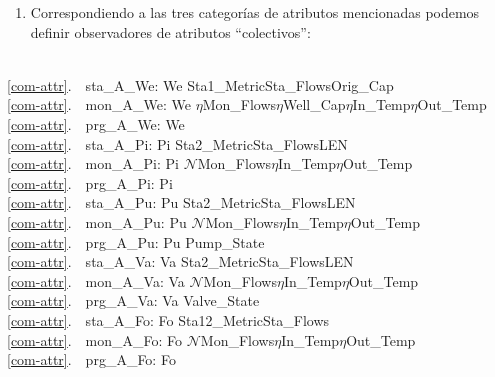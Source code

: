 \mnewfoil%
\normalsize\HHHH
\noindent
\begin{enumerate}\setei
\item \label{com-attr} Correspondiendo a las tres categorías de atributos mencionadas
      podemos definir observadores de atributos ``colectivos'':
\savei\end{enumerate}

\bp
{}\\
\ref{com-attr}.\ \ sta\_A\_We: We {\RIGHTARROW} Sta1\_Metric{\TIMES}Sta\_Flows{\TIMES}Orig\_Cap{\TIMES}{\DOTDOTDOT}\\
\ref{com-attr}.\ \ mon\_A\_We: We {\RIGHTARROW} $\eta$Mon\_Flows{\TIMES}$\eta$Well\_Cap{\TIMES}$\eta$In\_Temp{\TIMES}$\eta$Out\_Temp{\TIMES}{\DOTDOTDOT}\\
\ref{com-attr}.\ \ prg\_A\_We: We {\RIGHTARROW} {\DOTDOTDOT}\\
\ref{com-attr}.\ \ sta\_A\_Pi: Pi {\RIGHTARROW} Sta2\_Metric{\TIMES}Sta\_Flows{\TIMES}LEN{\TIMES}{\DOTDOTDOT}\\
\ref{com-attr}.\ \ mon\_A\_Pi: Pi {\RIGHTARROW} $\mathcal{N}$Mon\_Flows{\TIMES}$\eta$In\_Temp{\TIMES}$\eta$Out\_Temp{\TIMES}{\DOTDOTDOT} \\
\ref{com-attr}.\ \ prg\_A\_Pi: Pi {\RIGHTARROW} {\DOTDOTDOT} \\
\ref{com-attr}.\ \ sta\_A\_Pu: Pu {\RIGHTARROW} Sta2\_Metric{\TIMES}Sta\_Flows{\TIMES}LEN{\TIMES}{\DOTDOTDOT}\\
\ref{com-attr}.\ \ mon\_A\_Pu: Pu {\RIGHTARROW} $\mathcal{N}$Mon\_Flows{\TIMES}$\eta$In\_Temp{\TIMES}$\eta$Out\_Temp{\TIMES}{\DOTDOTDOT}\\
\ref{com-attr}.\ \ prg\_A\_Pu: Pu {\RIGHTARROW} Pump\_State{\TIMES}{\DOTDOTDOT} \\
\ref{com-attr}.\ \ sta\_A\_Va: Va {\RIGHTARROW} Sta2\_Metric{\TIMES}Sta\_Flows{\TIMES}LEN{\TIMES}{\DOTDOTDOT}\\
\ref{com-attr}.\ \ mon\_A\_Va: Va {\RIGHTARROW} $\mathcal{N}$Mon\_Flows{\TIMES}$\eta$In\_Temp{\TIMES}$\eta$Out\_Temp{\TIMES}{\DOTDOTDOT}\\
\ref{com-attr}.\ \ prg\_A\_Va: Va {\RIGHTARROW} Valve\_State{\TIMES}{\DOTDOTDOT} \\
\ref{com-attr}.\ \ sta\_A\_Fo: Fo {\RIGHTARROW} Sta12\_Metric{\TIMES}Sta\_Flows{\TIMES}{\DOTDOTDOT}\\
\ref{com-attr}.\ \ mon\_A\_Fo: Fo {\RIGHTARROW} $\mathcal{N}$Mon\_Flows{\TIMES}$\eta$In\_Temp{\TIMES}$\eta$Out\_Temp{\TIMES}{\DOTDOTDOT} \\
\ref{com-attr}.\ \ prg\_A\_Fo: Fo {\RIGHTARROW} {\DOTDOTDOT} \\
